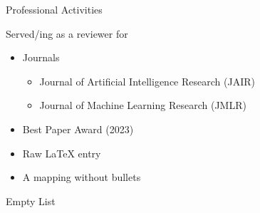 \documentclass{resume}
\begin{document}
    \begin{rSection}{ Professional Activities }
    
        Served/ing as a reviewer for\begin{itemize}[leftmargin=*]
    
        
            \item Journals
            \begin{itemize}
                
                    \item Journal of Artificial Intelligence Research (JAIR)
                
                    \item Journal of Machine Learning Research (JMLR)
                
            \end{itemize}
        
        
            \item Best Paper Award (2023)
        
            \item Raw \LaTeX{} entry
        
            \item A mapping without bullets
    \end{itemize}
    \end{rSection}

    \begin{rSection}{ Empty List }
    
    \end{rSection}
\end{document}
